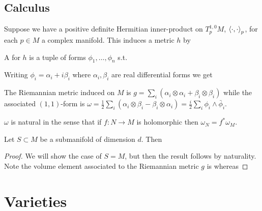 \documentclass{article}
\begin{document}
\subsection{Calculus}
Suppose we have a positive definite Hermitian inner-product on $T^{1,0}_pM$, $\left\langle \cdot,\cdot \right\rangle_p$, for each $p\in M$ a complex manifold. This induces a metric $h$ by 
\begin{definition}
	A  for $h$ is a tuple of forms $\phi_1, \dots, \phi_n$ s.t. 
\end{definition}
Writing $\phi_i = \alpha_i + i \beta_i $ where $\alpha_i,\beta_i$ are real differential forms we get 
\begin{notation}
	The Riemannian metric induced on $M$ is $g = \sum_i (\alpha_i \otimes \alpha_i + \beta_i \otimes \beta_i)$ while the associated $(1,1)$-form is $\omega = \frac{1}{2}\sum_i (\alpha_i \otimes\beta_i - \beta_i \otimes \alpha_i) = \frac{i}{2} \sum_i \phi_i \wedge \bar{\phi}_i$. 
\end{notation}

\begin{lemma}
	$\omega$ is natural in the sense that if $f:N \to M$ is holomorphic then $\omega_N = f^\ast \omega_M$. 
\end{lemma}

\begin{theorem}[Wirtinger]
	Let $S \subset M$ be a submanifold of dimension $d$. Then 
\end{theorem}
\begin{proof}
	We will show the case of $S=M$, but then the result follows by naturality. Note the volume element associated to the Riemannian metric $g$ is 
whereas 
\end{proof}

\section{Varieties}
\end{document}
